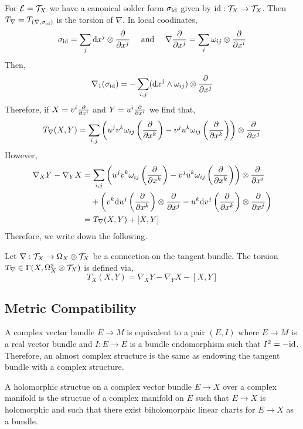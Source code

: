 \documentclass[12pt]{article}
\begin{document}
\begin{rmk}
For $\mathcal{E} = \mathcal{T}_X$ we have a canonical solder form $\sigma_{\mathrm{id}}$ given by $\mathrm{id} : \mathcal{T}_X \to \mathcal{T}_X$. Then $T_{\nabla} = T_{(\nabla, \sigma_{\mathrm{id}})}$ is the torsion of $\nabla$. In local coodinates,
\[ \sigma_{\mathrm{id}} = \sum_{j} \mathrm{d}{x^j} \otimes \frac{\partial{}}{\partial{x^j}} \quad \text{ and } \quad \nabla \frac{\partial{}}{\partial{x^j}} = \sum_i \omega_{ij} \otimes \frac{\partial{}}{\partial{x^i}}  \]
Then,
\[ \nabla_1(\sigma_{\mathrm{id}}) = -\sum_{i,j} (\mathrm{d}{x^j} \wedge \omega_{ij}) \otimes \frac{\partial{}}{\partial{x^j}} \]
Therefore, if $X = v^i \frac{\partial{}}{\partial{x^i}}$ and $Y = u^i \frac{\partial{}}{\partial{x^i}}$ we find that,
\begin{align*}
T_\nabla(X, Y) = \sum_{i,j} \left( u^j v^k \omega_{ij}\left(\frac{\partial{}}{\partial{x^k}}\right) - v^j u^k \omega_{ij} \left( \frac{\partial{}}{\partial{x^k}} \right) \right)  \otimes \frac{\partial{}}{\partial{x^j}}
\end{align*}
However,
\begin{align*}
\nabla_X Y - \nabla_Y X & =  \sum_{i,j} \left( u^j v^k \omega_{ij} \left( \frac{\partial{}}{\partial{x^k}} \right) - v^j u^k \omega_{ij} \left( \frac{\partial{}}{\partial{x^k}} \right) \right) \otimes \frac{\partial{}}{\partial{x^i}} 
\\
& \quad + \left( v^k \mathrm{d}{u^j} \left( \frac{\partial{}}{\partial{x^k}} \right) \otimes \frac{\partial{}}{\partial{x^j}} - u^k \mathrm{d}{v^j} \left( \frac{\partial{}}{\partial{x^k}} \right) \otimes \frac{\partial{}}{\partial{x^j}} \right)
\\
& = T_\nabla(X, Y) + [X, Y] 
\end{align*}
Therefore, we write down the following.
\end{rmk}

\begin{defn}
Let $\nabla : \mathcal{T}_X \to \Omega_X \otimes \mathcal{T}_X$ be a connection on the tangent bundle. The torsion $T_\nabla \in \Gamma(X, \Omega_X^2 \otimes \mathcal{T}_X)$ is defined via,
\[ T_X(X,Y) = \nabla_X Y - \nabla_Y X - [X, Y] \]
\end{defn}

\subsection{Metric Compatibility}

\begin{rmk}
A complex vector bundle $E \to M$ is equivalent to a pair $(E, I)$ where $E \to M$ is a real vector bundle and $I : E \to E$ is a bundle endomorphism such that $I^2 = - \mathrm{id}$. Therefore, an almost complex structure is the same as endowing the tangent bundle with a complex structure.  
\end{rmk}

\begin{rmk}
A holomorphic structue on a complex vector bundle $E \to X$ over a complex manifold is the structue of a complex manifold on $E$ such that $E \to X$ is holomorphic and such that there exist biholomorphic linear charts for $E \to X$ as a bundle. 
\end{rmk}
\end{document}
